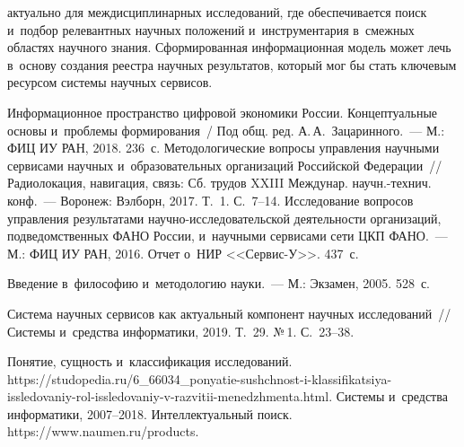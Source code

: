 \begin{multicols}{2}


\noindent
 актуально для междисциплинарных исследований, где 
обеспечивается поиск и~подбор релевантных научных положений 
и~инструментария в~смежных областях научного знания. Сформированная 
информационная модель может лечь в~основу создания реестра научных 
результатов, который мог бы стать ключевым ресурсом системы научных 
сервисов.

\vspace*{-12pt}

{\small\frenchspacing
 {%
 \begin{thebibliography}{9}
Информационное пространство цифровой экономики России. 
Концептуальные основы и~проблемы формирования~/ Под общ. ред. 
А.\,А.~Зацаринного.~--- М.: ФИЦ ИУ РАН, 2018. 236~с. 
 Методологические 
вопросы управления научными сервисами научных и~образовательных 
организаций Российской Федерации~// Радиолокация, навигация, связь: Сб. 
трудов XXIII Междунар. научн.-технич. конф.~--- Воронеж: Вэлборн, 2017. 
Т.~1. С.~7--14.
Исследование вопросов управления результатами на\-уч\-но-ис\-сле\-до\-ва\-тель\-ской 
деятельности организаций, подведомственных ФАНО России, и~научными 
сервисами сети ЦКП ФАНО.~--- М.: ФИЦ ИУ РАН, 2016. 
 Отчет о~НИР  <<Сервис-У>>. 437~с. 

 Введение в~философию и~методологию науки.~--- М.: 
Экзамен, 2005. 528~с. 

 Система научных 
сервисов как актуальный компонент научных исследований~// Системы 
и~средства информатики, 2019. Т.~29. №\,1. С.~23--38.

Понятие, сущность и~классификация исследований. {\sf 
https://studopedia.ru/6\_66034\_ponyatie-sushchnost-i-klassifikatsiya-issledovaniy-rol-issledovaniy-v-razvitii-menedzhmenta.html}.
Системы и~средства информатики, 2007--2018.
Интеллектуальный поиск. {\sf https://www.naumen.ru/\linebreak products}.
 \end{thebibliography}

 }
 }

\end{multicols}

